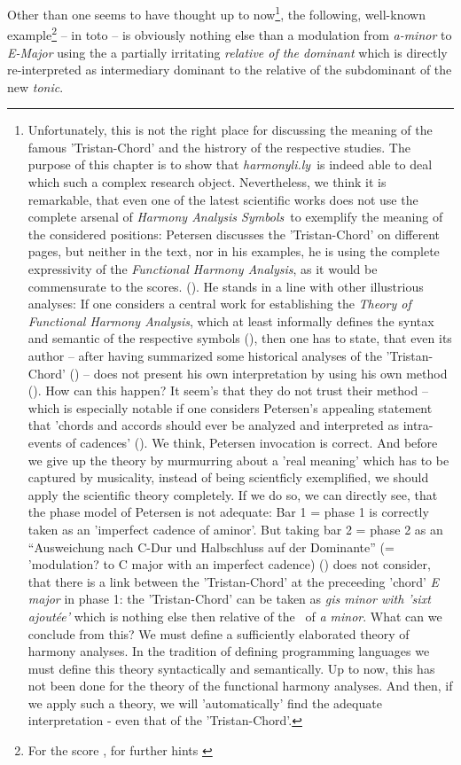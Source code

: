 \documentclass[
  DIV=calc,
  BCOR=5mm,
  12pt,
  headings=small,
  oneside,
  abstract=true,
  toc=bib,
  xcolor=dvipsnames,
  openany,
  ngerman,english]{scrartcl}
\newcommand{\acc}[0]{\textit}
\newcommand{\hlyn}[0]{\textit{harmonyli.ly}}
\newcommand{\has}[1]{\textit{Harmony Analysis Symbol#1}}
\begin{document}
Other than one seems to have thought up to now\footnote{Unfortunately, this is
not the right place for discussing the meaning of the famous 'Tristan-Chord' and
the histrory of the respective studies. The purpose of this chapter is to show
that \hlyn\ is indeed able to deal which such a complex research object.
Nevertheless, we think it is remarkable, that even one of the latest scientific
works does not use the complete arsenal of \has{s}\ to exemplify the meaning of
the considered positions: Petersen discusses the 'Tristan-Chord' on different
pages, but neither in the text, nor in his examples, he is using the complete
expressivity of the \acc{Functional Harmony Analysis}, as it
would be commensurate to the scores. (\cite[cf.][48f, 50f, 56ff,
59]{Petersen2019a}). He stands in a line with other illustrious analyses: If one
considers a central work for establishing the \acc{Theory of Functional Harmony
Analysis}, which at least informally defines the syntax and semantic of the
respective symbols (\cite[cf.][282]{Delamotte2011a}), then one has to state,
that even its author -- after having summarized some historical analyses of the
'Tristan-Chord' (\cite[cf.][225-227]{Delamotte2011a}) -- does not present his
own interpretation by using his own method (\cite[cf.][227f]{Delamotte2011a}).
How can this happen? It seem's that they do not trust their method -- which is
especially notable if one considers Petersen's appealing statement that 'chords
and accords should ever be analyzed and interpreted as intra-events of
cadences' (\cite[cf.][51]{Petersen2019a}).
We think, Petersen invocation is correct. And before we give up the theory by
murmurring about a 'real meaning' which has to be captured by musicality,
instead of being scientficly exemplified, we should apply the scientific theory
completely. If we do so, we can directly see, that the phase model of Petersen
is not adequate:
Bar 1 = phase 1 is correctly taken as an 'imperfect cadence of aminor'. But
taking bar 2 = phase 2 as an \enquote{Ausweichung nach C-Dur und Halbschluss auf
der Dominante} (=
'modulation? to C major with an imperfect cadence)
(\cite[cf.][51]{Petersen2019a}) does not consider, that there is a link between
the 'Tristan-Chord' at the preceeding 'chord' \acc{E major} in phase 1: the
'Tristan-Chord' can be taken as \acc{gis minor with 'sixt ajoutée'} which is
nothing else then relative of the \DD{}\ of \acc{a minor}.
What can we conclude from this? We must define a sufficiently elaborated theory
of harmony analyses. In the tradition of defining programming languages we must
define this theory syntactically and semantically. Up to now, this has not been
done for the theory of the functional harmony analyses. And then, if we apply
such a theory, we will 'automatically' find the adequate interpretation - even
that of the 'Tristan-Chord'.}, the following, well-known example\footnote{For
the score \cite[cf.][\nopage]{wpTristan2019b}, for further hints
\cite[cf.][\nopage]{wpTristan2019a}} -- in toto -- is obviously nothing else
than a modulation from \acc{a-minor} to \acc{E-Major} using the a partially
irritating \acc{relative of the dominant} which is directly re-interpreted as
intermediary dominant to the relative of the subdominant of the new \acc{tonic}.
\end{document}
